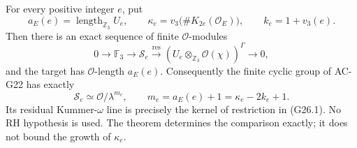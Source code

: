 \begin{theorem}
\label{AC-G26}
For every positive integer $e$, put
\[
 a_E(e)=\operatorname{length}_{\mathbb Z_3}U_e,\qquad
 \kappa_e=v_3\bigl(\#K_{2e}(\mathcal O_E)\bigr),\qquad
 k_e=1+v_3(e).
\]
Then there is an exact sequence of finite $\mathcal O$-modules
\[
 0\longrightarrow\mathbb F_3\longrightarrow\mathcal S_e
 \xrightarrow{\operatorname{res}}
       (U_e\otimes_{\mathbb Z_3}\mathcal O(\chi))^\Gamma
 \longrightarrow0,                                    \tag{G26.1}
\]
and the target has $\mathcal O$-length $a_E(e)$.
Consequently the finite cyclic group of AC-G22 has exactly
\[
 \mathcal S_e\simeq\mathcal O/\lambda^{m_e},\qquad
 \boxed{m_e=a_E(e)+1=\kappa_e-2k_e+1}.                 \tag{G26.2}
\]
Its residual Kummer-$\omega$ line is precisely the kernel of
restriction in (G26.1).  No RH hypothesis is used.
The theorem determines the comparison exactly; it does not
bound the growth of $\kappa_e$.
\end{theorem}
